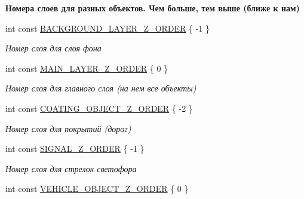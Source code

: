 \begin{Indent}\textbf{ Номера слоев для разных объектов. Чем больше, тем выше (ближе к нам)}\par
\begin{DoxyCompactItemize}
\item 
\mbox{\label{namespacertm_ad2cc1ec80df148f75e40e2c8d2933964}} 
int const \hyperlink{namespacertm_ad2cc1ec80df148f75e40e2c8d2933964}{B\+A\+C\+K\+G\+R\+O\+U\+N\+D\+\_\+\+L\+A\+Y\+E\+R\+\_\+\+Z\+\_\+\+O\+R\+D\+ER} \{ -\/1 \}
\begin{DoxyCompactList}\small\item\em Номер слоя для слоя фона \end{DoxyCompactList}\item 
\mbox{\label{namespacertm_aa302158d9203b0852c0e2905c446495a}} 
int const \hyperlink{namespacertm_aa302158d9203b0852c0e2905c446495a}{M\+A\+I\+N\+\_\+\+L\+A\+Y\+E\+R\+\_\+\+Z\+\_\+\+O\+R\+D\+ER} \{ 0 \}
\begin{DoxyCompactList}\small\item\em Номер слоя для главного слоя (на нем все объекты) \end{DoxyCompactList}\item 
\mbox{\label{namespacertm_a85a3b25dc036bde14f8874ebf9ef9cd2}} 
int const \hyperlink{namespacertm_a85a3b25dc036bde14f8874ebf9ef9cd2}{C\+O\+A\+T\+I\+N\+G\+\_\+\+O\+B\+J\+E\+C\+T\+\_\+\+Z\+\_\+\+O\+R\+D\+ER} \{ -\/2 \}
\begin{DoxyCompactList}\small\item\em Номер слоя для покрытий (дорог) \end{DoxyCompactList}\item 
\mbox{\label{namespacertm_a9f1c251955a1ad013b213eeb79eebc6c}} 
int const \hyperlink{namespacertm_a9f1c251955a1ad013b213eeb79eebc6c}{S\+I\+G\+N\+A\+L\+\_\+\+Z\+\_\+\+O\+R\+D\+ER} \{ -\/1 \}
\begin{DoxyCompactList}\small\item\em Номер слоя для стрелок светофора \end{DoxyCompactList}\item 
\mbox{\label{namespacertm_a1f9ff2936d20057085f7b0084e7a20ca}} 
int const \hyperlink{namespacertm_a1f9ff2936d20057085f7b0084e7a20ca}{V\+E\+H\+I\+C\+L\+E\+\_\+\+O\+B\+J\+E\+C\+T\+\_\+\+Z\+\_\+\+O\+R\+D\+ER} \{ 0 \}

\end{DoxyCompactItemize}
\end{Indent}
